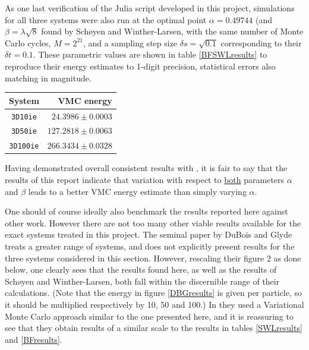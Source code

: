 \documentclass[a4paper,8pt]{article}
\begin{document}
\begin{multicols}{2}
As one last verification of the Julia script developed in this project, simulations for all three systems were also run at the optimal point ${\alpha = 0.49744}$ (and ${\beta = \lambda  \sqrt{8}}$ found by Schøyen and Winther-Larsen, with the same number of Monte Carlo cycles, ${M = 2^{21}}$, and a sampling step size ${\delta s = \sqrt{0.1}}$ corresponding to their $\delta t = 0.1$. These parametric values are shown in table \ref{BFSWLresults} to reproduce their energy estimates to 1-digit precision, statistical errors also matching in magnitude.

\begin{center}\small
{}
\label{BFSWLresults}
\begin{tabular}{cr}
	\hline\hline
	System & VMC energy \\
	\hline
    \texttt{3D10ie} & $24.3986 \pm 0.0003$\\
    \texttt{3D50ie} & $127.2818 \pm 0.0063$\\
    \texttt{3D100ie} & $266.3434 \pm 0.0328$\\
    \hline\hline
\end{tabular}
\end{center}

Having demonstrated overall consistent results with \cite{SWL}, it is fair to say that the results of this report indicate that variation with respect to \underline{both} parameters $\alpha$ and $\beta$ leads to a better VMC energy estimate than simply varying $\alpha$.

One should of course ideally also benchmark the results reported here against other work. However there are not too many other viable results available for the exact systems treated in this project. The seminal paper by DuBois and Glyde\cite{DBG} treats a greater range of systems, and does not explicitly present results for the three systems considered in this section. However, rescaling their figure 2 as done below, one clearly sees that the results found here, as well as the results of Schøyen and Winther-Larsen\cite{SWL}, both fall within the discernible range of their calculations. (Note that the energy in figure \ref{DBGresults} is given per particle, so it should be multiplied respectively by 10, 50 and 100.) In \cite{DBG} they used a Variational Monte Carlo approach similar to the one presented here, and it is reassuring to see that they obtain results of a similar scale to the results in tables \ref{SWLresults} and \ref{BFresults}.


\end{multicols}
\end{document}
